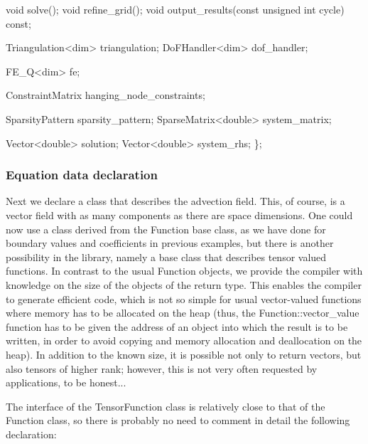 \begin{DoxyCode}
    \textcolor{keywordtype}{void} solve();
    \textcolor{keywordtype}{void} refine\_grid();
    \textcolor{keywordtype}{void} output\_results(\textcolor{keyword}{const} \textcolor{keywordtype}{unsigned} \textcolor{keywordtype}{int} cycle) \textcolor{keyword}{const};

    Triangulation<dim> triangulation;
    DoFHandler<dim> dof\_handler;

    FE\_Q<dim> fe;

    ConstraintMatrix hanging\_node\_constraints;

    SparsityPattern sparsity\_pattern;
    SparseMatrix<double> system\_matrix;

    Vector<double> solution;
    Vector<double> system\_rhs;
\};
\end{DoxyCode}


\label{_Equationdatadeclaration}%
 \subsubsection*{Equation data declaration}

Next we declare a class that describes the advection field. This, of course, is a vector field with as many components as there are space dimensions. One could now use a class derived from the {\ttfamily Function} base class, as we have done for boundary values and coefficients in previous examples, but there is another possibility in the library, namely a base class that describes tensor valued functions. In contrast to the usual {\ttfamily Function} objects, we provide the compiler with knowledge on the size of the objects of the return type. This enables the compiler to generate efficient code, which is not so simple for usual vector-\/valued functions where memory has to be allocated on the heap (thus, the {\ttfamily Function\+::vector\+\_\+value} function has to be given the address of an object into which the result is to be written, in order to avoid copying and memory allocation and deallocation on the heap). In addition to the known size, it is possible not only to return vectors, but also tensors of higher rank; however, this is not very often requested by applications, to be honest...

The interface of the {\ttfamily Tensor\+Function} class is relatively close to that of the {\ttfamily Function} class, so there is probably no need to comment in detail the following declaration\+:


